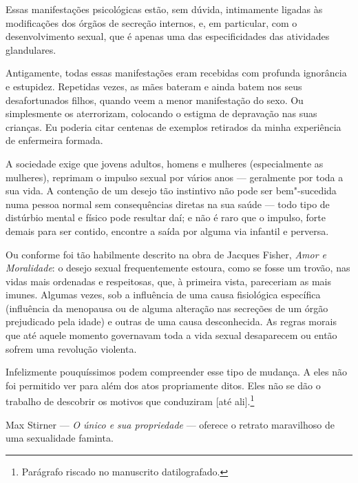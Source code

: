 Essas manifestações psicológicas estão, sem dúvida, intimamente ligadas
às modificações dos órgãos de secreção internos, e, em particular, com o
desenvolvimento sexual, que é apenas uma das especificidades das atividades
glandulares.

Antigamente, todas essas manifestações eram recebidas com profunda
ignorância e estupidez. Repetidas vezes, as mães bateram e ainda batem
nos seus desafortunados filhos, quando veem a menor manifestação do
sexo. Ou simplesmente os aterrorizam, colocando o estigma de depravação nas suas
crianças. Eu poderia citar centenas de exemplos retirados da minha
experiência de enfermeira formada.

A sociedade exige que jovens adultos, homens e mulheres (especialmente
as mulheres), reprimam o impulso sexual por vários anos --- geralmente
por toda a sua vida. A contenção de um desejo tão instintivo não pode
ser bem"-sucedida numa pessoa normal sem consequências diretas na sua
saúde --- todo tipo de distúrbio mental e físico pode resultar daí; e não
é raro que o impulso, forte demais para ser contido, encontre a saída
por alguma via infantil e perversa.

\asterisc

Ou conforme foi tão habilmente descrito na obra de Jacques Fisher,
\emph{Amor e Moralidade}: o desejo sexual frequentemente estoura, como
se fosse um trovão, nas vidas mais ordenadas e respeitosas, que, à
primeira vista, pareceriam as mais imunes. Algumas vezes, sob a
influência de uma causa fisiológica específica (influência da menopausa
ou de alguma alteração nas secreções de um órgão prejudicado pela idade)
e outras de uma causa desconhecida. As regras morais que até aquele
momento governavam toda a vida sexual desaparecem ou então sofrem uma
revolução violenta.

Infelizmente pouquíssimos podem compreender esse tipo de mudança. A eles não foi permitido
ver para além dos atos propriamente ditos. Eles não se dão o trabalho de
descobrir os motivos que conduziram {[}até ali{]}.\footnote{Parágrafo
  riscado no manuscrito datilografado.}

\asterisc

Max Stirner --- \emph{O único e sua propriedade} --- oferece o retrato
maravilhoso de uma sexualidade faminta.

